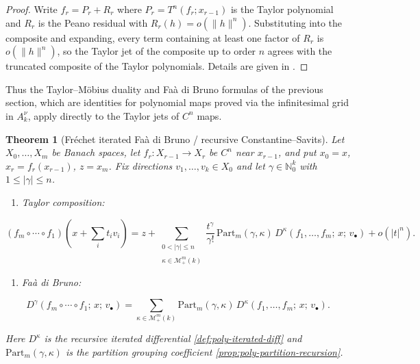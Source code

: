 \documentclass[10pt,a4paper]{article}
\theoremstyle{plain}
\newtheorem{theorem}{Theorem}
\theoremstyle{definition}
\newcommand{\IN}{\mathbb{N}} %
\newcommand{\1}{\mathbb{1}} %
\newcommand{\tightlist}{\setlength{\itemsep}{0pt}\setlength{\parskip}{0pt}}
\newcommand{\KM}{\mathcal{M}} %
\newcommand{\Part}{\mathrm{Part}} %
\begin{document}
\begin{proof}

Write \(f_r = P_r + R_r\) where \(P_r = T^n(f_r; x_{r-1})\) is the
Taylor polynomial and \(R_r\) is the Peano residual with
\(R_r(h) = o(\|h\|^n)\). Substituting into the composite and expanding,
every term containing at least one factor of \(R_r\) is \(o(\|h\|^n)\),
so the Taylor jet of the composite up to order \(n\) agrees with the
truncated composite of the Taylor polynomials. Details are given in
\citep{Hartmann2025FDB}.

\end{proof}

Thus the Taylor--Möbius duality and Faà di Bruno formulas of the
previous section, which are identities for polynomial maps proved via
the infinitesimal grid in \(A_k^\nu\), apply directly to the Taylor jets
of \(C^n\) maps.

\begin{theorem}[Fréchet iterated Faà di Bruno / recursive Constantine--Savits]

\label{thm:frechet-fdb} Let \(X_0, \dots, X_m\) be Banach spaces, let
\(f_r: X_{r-1} \to X_r\) be \(C^n\) near \(x_{r-1}\), and put
\(x_0 = x\), \(x_r = f_r(x_{r-1})\), \(z = x_m\). Fix directions
\(v_1, \dots, v_k \in X_0\) and let \(\gamma \in \IN_0^k\) with
\(1 \leq |\gamma| \leq n\).

\begin{enumerate}
\def\labelenumi{\arabic{enumi})}
\tightlist
\item
  \emph{Taylor composition:}
\end{enumerate}

\[
  (f_m \circ \cdots \circ f_1)(x + {\textstyle\sum_i} t_i v_i) = z + \sum_{\substack{0 < |\gamma| \leq n \\\\ \kappa \in \KM_+^m(k)}} \frac{t^\gamma}{\gamma!}\, \Part_m(\gamma, \kappa)\, D^\kappa(f_1, \dots, f_m;\, x;\, v_\bullet) + o(|t|^n).
\]

\begin{enumerate}
\def\labelenumi{\arabic{enumi})}
\setcounter{enumi}{1}
\tightlist
\item
  \emph{Faà di Bruno:}
\end{enumerate}

\[
  D^\gamma(f_m \circ \cdots \circ f_1;\, x;\, v_\bullet) = \sum_{\kappa \in \KM_+^m(k)} \Part_m(\gamma, \kappa)\, D^\kappa(f_1, \dots, f_m;\, x;\, v_\bullet).
\]

Here \(D^\kappa\) is the recursive iterated differential
\ref{def:poly-iterated-diff} and \(\Part_m(\gamma, \kappa)\) is the
partition grouping coefficient \ref{prop:poly-partition-recursion}.

\end{theorem}
\end{document}
